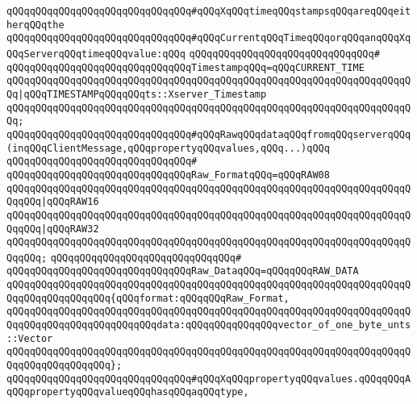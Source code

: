 \newline
\verb|qQQqqQQqqQQqqQQqqQQqqQQqqQQqqQQq#qQQqXqQQqtimeqQQqstampsqQQqareqQQqeitherqQQqthe|\newline
\verb|qQQqqQQqqQQqqQQqqQQqqQQqqQQqqQQq#qQQqCurrentqQQqTimeqQQqorqQQqanqQQqXqQQqServerqQQqtimeqQQqvalue:qQQq|\newline
\verb|qQQqqQQqqQQqqQQqqQQqqQQqqQQqqQQq#|\newline
\verb|qQQqqQQqqQQqqQQqqQQqqQQqqQQqqQQqTimestampqQQq=qQQqCURRENT_TIME|\newline
\verb|qQQqqQQqqQQqqQQqqQQqqQQqqQQqqQQqqQQqqQQqqQQqqQQqqQQqqQQqqQQqqQQqqQQqqQQq|\verb#|qQQqTIMESTAMPqQQqqQQqts::Xserver_Timestamp#\newline
\verb|qQQqqQQqqQQqqQQqqQQqqQQqqQQqqQQqqQQqqQQqqQQqqQQqqQQqqQQqqQQqqQQqqQQqqQQq;|\newline
\newline
\newline
\verb|qQQqqQQqqQQqqQQqqQQqqQQqqQQqqQQq#qQQqRawqQQqdataqQQqfromqQQqserverqQQq(inqQQqClientMessage,qQQqpropertyqQQqvalues,qQQq...)qQQq|\newline
\verb|qQQqqQQqqQQqqQQqqQQqqQQqqQQqqQQq#|\newline
\verb|qQQqqQQqqQQqqQQqqQQqqQQqqQQqqQQqRaw_FormatqQQq=qQQqRAW08|\newline
\verb|qQQqqQQqqQQqqQQqqQQqqQQqqQQqqQQqqQQqqQQqqQQqqQQqqQQqqQQqqQQqqQQqqQQqqQQqqQQq|\verb#|qQQqRAW16#\newline
\verb|qQQqqQQqqQQqqQQqqQQqqQQqqQQqqQQqqQQqqQQqqQQqqQQqqQQqqQQqqQQqqQQqqQQqqQQqqQQq|\verb#|qQQqRAW32#\newline
\verb|qQQqqQQqqQQqqQQqqQQqqQQqqQQqqQQqqQQqqQQqqQQqqQQqqQQqqQQqqQQqqQQqqQQqqQQqqQQq;|\newline
\verb|qQQqqQQqqQQqqQQqqQQqqQQqqQQqqQQq#|\newline
\verb|qQQqqQQqqQQqqQQqqQQqqQQqqQQqqQQqRaw_DataqQQq=qQQqqQQqRAW_DATA|\newline
\verb|qQQqqQQqqQQqqQQqqQQqqQQqqQQqqQQqqQQqqQQqqQQqqQQqqQQqqQQqqQQqqQQqqQQqqQQqqQQqqQQqqQQqqQQq{qQQqformat:qQQqqQQqRaw_Format,|\newline
\verb|qQQqqQQqqQQqqQQqqQQqqQQqqQQqqQQqqQQqqQQqqQQqqQQqqQQqqQQqqQQqqQQqqQQqqQQqqQQqqQQqqQQqqQQqqQQqqQQqdata:qQQqqQQqqQQqqQQqvector_of_one_byte_unts::Vector|\newline
\verb|qQQqqQQqqQQqqQQqqQQqqQQqqQQqqQQqqQQqqQQqqQQqqQQqqQQqqQQqqQQqqQQqqQQqqQQqqQQqqQQqqQQqqQQq};|\newline
\newline
\verb|qQQqqQQqqQQqqQQqqQQqqQQqqQQqqQQq#qQQqXqQQqpropertyqQQqvalues.qQQqqQQqAqQQqpropertyqQQqvalueqQQqhasqQQqaqQQqtype,|\newline
